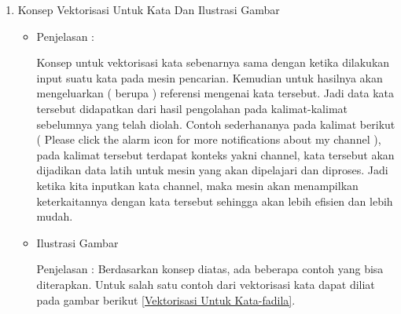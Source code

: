 \begin{enumerate}
\begin{itemize}
\par 
\item Contoh Gambar
\par Penjelasan : Berdasarkan penjelasan diatas, ada beberapa contoh yang lain bisa diterapkan. Untuk salah satu contoh dari vektor dataset googlei dapat diliat pada gambar berikut \ref{Dimensi Vektor Dataset Wikipedia-fadila} dan \ref{Dimensi Vektor Dataset-fadila}.
\begin{figure}[!hbtp]
\centering
\texttt{[image: figures/google-dataset-wikipedia-fadila.jpg]}
\caption{Dimensi Vektor Dataset Wikipedia-fadila}
\label{Dimensi Vektor Dataset Wikipedia-fadila}
\end{figure}
\par
\begin{figure}[!hbtp]
\centering
\texttt{[image: figures/google-dataset-fadila.jpg]}
\caption{Dimensi Vektor Dataset -fadila}
\label{Dimensi Vektor Dataset-fadila}
\end{figure}
\par
\end{itemize}
\par
\par
\item Konsep Vektorisasi Untuk Kata Dan Ilustrasi Gambar
\begin{itemize}
\item  Penjelasan :
\par Konsep untuk vektorisasi kata sebenarnya sama dengan ketika dilakukan input suatu kata pada mesin pencarian. Kemudian untuk hasilnya akan mengeluarkan ( berupa ) referensi mengenai kata tersebut. Jadi data kata tersebut didapatkan dari hasil pengolahan pada kalimat-kalimat sebelumnya yang telah diolah. Contoh sederhananya pada kalimat berikut ( Please click the alarm icon for more notifications about my channel ), pada kalimat tersebut terdapat konteks yakni channel, kata tersebut akan dijadikan data latih untuk mesin yang akan dipelajari dan diproses. Jadi ketika kita inputkan kata channel, maka mesin akan menampilkan keterkaitannya dengan kata tersebut sehingga akan lebih efisien dan lebih mudah.
\par
\item Ilustrasi Gambar
\par Penjelasan : Berdasarkan konsep diatas, ada beberapa contoh yang bisa diterapkan. Untuk salah satu contoh dari vektorisasi kata dapat diliat pada gambar berikut \ref{Vektorisasi Untuk Kata-fadila}.
\begin{figure}[!hbtp]
\centering

\end{figure}
\end{itemize}
\end{enumerate}
